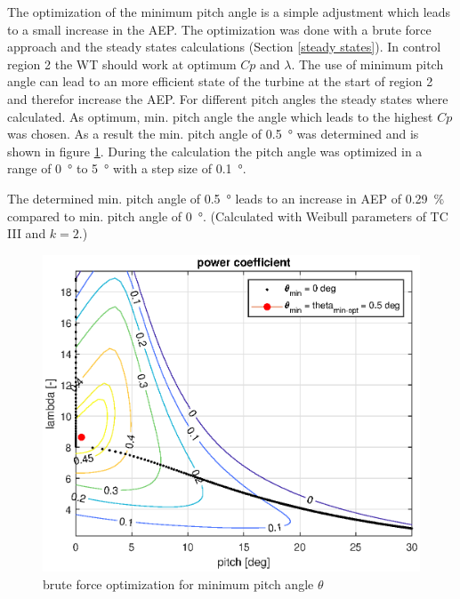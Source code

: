 The optimization of the minimum pitch angle is a simple adjustment which leads to a small increase in the AEP. 
The optimization was done with a brute force approach and the steady states calculations (Section \ref{steady states}). 
In control region 2 the WT should work at optimum $Cp$ and $\lambda$. 
The use of minimum pitch angle can lead to an more efficient state of the turbine at the start of region 2 and therefor increase the AEP. 
For different pitch angles the steady states where calculated. 
As optimum, min. pitch angle the angle which leads to the highest $Cp$ was chosen. 
As a result the min. pitch angle of \SI{0.5}{\degree} was determined and is shown in figure \ref{fig:theta min general}. 
During the calculation the pitch angle was optimized in a range of \SI{0}{\degree} to \SI{5}{\degree} with a step size of \SI{0.1}{\degree}.

The determined min. pitch angle of \SI{0.5}{\degree} leads to an increase in AEP of \SI{0.29}{\%} compared to min. pitch angle of \SI{0}{\degree}. 
(Calculated with Weibull parameters of TC III and $k=2$.)

\begin{figure}[h]
	\centering	
	\includegraphics[width=12cm]{Figures/ThetaMinOpt}
	\caption{brute force optimization for minimum pitch angle $\theta$}
	\label{fig:theta min general}
\end{figure}